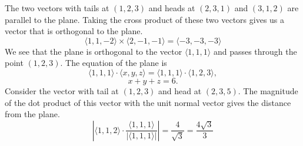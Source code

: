 {%
\begin{Solution}
\label{solution equation of plane 123 231 312}
The two vectors with tails at $(1,2,3)$ and heads at $(2,3,1)$ and $(3,1,2)$
are parallel to the plane.  Taking the cross product of these two vectors
gives us a vector that is orthogonal to the plane.
\[
\langle 1,1,-2 \rangle \times \langle 2,-1,-1 \rangle = \langle -3,-3,-3 \rangle
\]
We see that the plane is orthogonal to the vector $\langle 1,1,1 \rangle$ and passes
through the point $(1,2,3)$.  The equation of the plane is
\[
\langle 1,1,1 \rangle \cdot \langle x,y,z \rangle = \langle 1,1,1 \rangle \cdot \langle 1,2,3 \rangle,
\]
\[
x + y + z = 6.
\]
Consider the vector with tail at $(1,2,3)$ and head at $(2,3,5)$.  The
magnitude of the dot product of this vector with the unit normal vector gives
the distance from the plane.
\[
\left| \langle 1,1,2 \rangle \cdot \frac{ \langle 1,1,1 \rangle }{ | \langle 1,1,1 \rangle | } \right|
= \frac{4}{\sqrt{3}}
= \frac{4 \sqrt{3}}{3}
\]
\end{Solution}







\raggedbottom
}

